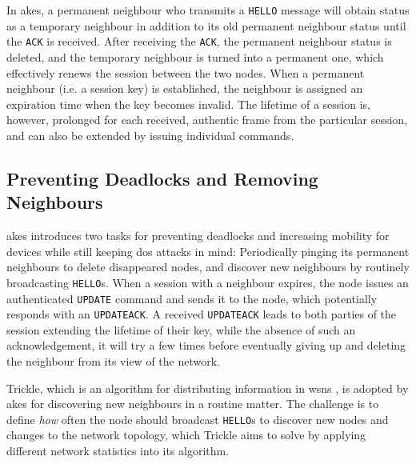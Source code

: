 In \gls{akes}, a permanent neighbour who transmits a \texttt{HELLO} message will obtain status as a temporary neighbour in addition to its old permanent neighbour status until the \texttt{ACK} is received. After receiving the \texttt{ACK}, the permanent neighbour status is deleted, and the temporary neighbour is turned into a permanent one, which effectively renews the session between the two nodes. When a permanent neighbour (i.e. a session key) is established, the neighbour is assigned an expiration time when the key becomes invalid. The lifetime of a session is, however, prolonged for each received, authentic frame from the particular session, and can also be extended by issuing individual commands. 

\subsection{Preventing Deadlocks and Removing Neighbours}

\gls{akes} introduces two tasks for preventing deadlocks and increasing mobility for devices while still keeping \gls{dos} attacks in mind: Periodically pinging its permanent neighbours to delete disappeared nodes, and discover new neighbours by routinely broadcasting \texttt{HELLO}s. When a session with a neighbour expires, the node issues an authenticated \texttt{UPDATE} command and sends it to the node, which potentially responds with an \texttt{UPDATEACK}. A received \texttt{UPDATEACK} leads to both parties of the session extending the lifetime of their key, while the absence of such an acknowledgement, it will try a few times before eventually giving up and deleting the neighbour from its view of the network.

Trickle, which is an algorithm for distributing information in \gls{wsn}s \cite{levis2011trickle}, is adopted by \gls{akes} for discovering new neighbours in a routine matter. The challenge is to define \emph{how} often the node should broadcast \texttt{HELLO}s to discover new nodes and changes to the network topology, which Trickle aims to solve by applying different network statistics into its algorithm.

